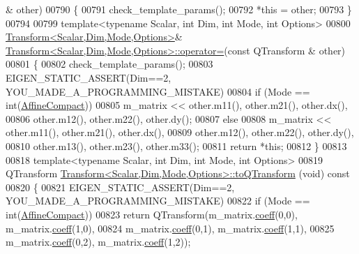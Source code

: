 \begin{DoxyCode}
      & other)
00790 \{
00791   check\_template\_params();
00792   *\textcolor{keyword}{this} = other;
00793 \}
00794 
00799 \textcolor{keyword}{template}<\textcolor{keyword}{typename} Scalar, \textcolor{keywordtype}{int} Dim, \textcolor{keywordtype}{int} Mode, \textcolor{keywordtype}{int} Options>
00800 \hyperlink{group___geometry___module_class_eigen_1_1_transform}{Transform<Scalar,Dim,Mode,Options>}& 
      \hyperlink{group___geometry___module_class_eigen_1_1_transform}{Transform<Scalar,Dim,Mode,Options>::operator=}(\textcolor{keyword}{const} QTransform
      & other)
00801 \{
00802   check\_template\_params();
00803   EIGEN\_STATIC\_ASSERT(Dim==2, YOU\_MADE\_A\_PROGRAMMING\_MISTAKE)
00804   \textcolor{keywordflow}{if} (Mode == \textcolor{keywordtype}{int}(\hyperlink{group__enums_ggaee59a86102f150923b0cac6d4ff05107aa30a06b60d218b709020972df47de2b0}{AffineCompact}))
00805     m\_matrix << other.m11(), other.m21(), other.dx(),
00806                 other.m12(), other.m22(), other.dy();
00807   \textcolor{keywordflow}{else}
00808     m\_matrix << other.m11(), other.m21(), other.dx(),
00809                 other.m12(), other.m22(), other.dy(),
00810                 other.m13(), other.m23(), other.m33();
00811   \textcolor{keywordflow}{return} *\textcolor{keyword}{this};
00812 \}
00813 
00818 \textcolor{keyword}{template}<\textcolor{keyword}{typename} Scalar, \textcolor{keywordtype}{int} Dim, \textcolor{keywordtype}{int} Mode, \textcolor{keywordtype}{int} Options>
00819 QTransform \hyperlink{group___geometry___module_class_eigen_1_1_transform}{Transform<Scalar,Dim,Mode,Options>::toQTransform}
      (\textcolor{keywordtype}{void})\textcolor{keyword}{ const}
00820 \textcolor{keyword}{}\{
00821   EIGEN\_STATIC\_ASSERT(Dim==2, YOU\_MADE\_A\_PROGRAMMING\_MISTAKE)
00822   \textcolor{keywordflow}{if} (Mode == \textcolor{keywordtype}{int}(\hyperlink{group__enums_ggaee59a86102f150923b0cac6d4ff05107aa30a06b60d218b709020972df47de2b0}{AffineCompact}))
00823     \textcolor{keywordflow}{return} QTransform(m\_matrix.\hyperlink{class_eigen_1_1_plain_object_base_afbfc12954f16d21aedb7bd839f64a278}{coeff}(0,0), m\_matrix.\hyperlink{class_eigen_1_1_plain_object_base_afbfc12954f16d21aedb7bd839f64a278}{coeff}(1,0),
00824                       m\_matrix.\hyperlink{class_eigen_1_1_plain_object_base_afbfc12954f16d21aedb7bd839f64a278}{coeff}(0,1), m\_matrix.\hyperlink{class_eigen_1_1_plain_object_base_afbfc12954f16d21aedb7bd839f64a278}{coeff}(1,1),
00825                       m\_matrix.\hyperlink{class_eigen_1_1_plain_object_base_afbfc12954f16d21aedb7bd839f64a278}{coeff}(0,2), m\_matrix.\hyperlink{class_eigen_1_1_plain_object_base_afbfc12954f16d21aedb7bd839f64a278}{coeff}(1,2));

\end{DoxyCode}
